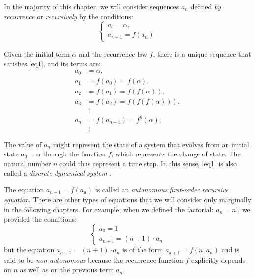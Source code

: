 In the majority of this chapter, we will consider sequences $a_n$ defined
\emph{by recurrence} or \emph{recursively} by the conditions:
\begin{equation}\label{eq1}
\begin{cases}
  a_0 = \alpha,\\
  a_{n+1} = f(a_n)
\end{cases}
\end{equation}

Given the initial term $\alpha$ and the recurrence law $f$, there is a unique
sequence that satisfies \eqref{eq1}, and its terms are:
\begin{align*}
a_0 & =\alpha,\\
a_1 &= f(a_0)=f(\alpha),\\
a_2 &= f(a_1)=f(f(\alpha)),\\
a_3 &= f(a_2)=f(f(f(\alpha))),\\
&\ \vdots\\
a_n &= f(a_{n-1}) = f^n(\alpha),\\
&\ \vdots
\end{align*}

The value of $a_n$ might represent the state of a system that evolves from an
initial state $a_0=\alpha$ through the function $f$, which represents the change
of state. The natural number $n$ could thus represent a time step. In this
sense, \eqref{eq1} is also called a \emph{discrete dynamical system}%
.

The equation $a_{n+1} = f(a_n)$ is called an \emph{autonomous first-order
recursive equation}. There are other types of equations that we will consider
only marginally in the following chapters. For example, when we defined the
factorial: $a_n = n!$, we provided the conditions:
\[
\begin{cases}
  a_0 = 1\\
  a_{n+1} = (n+1) \cdot a_n
\end{cases}
\]
but the equation $a_{n+1} = (n+1) \cdot a_n$ is of the form $a_{n+1} = f(n,
a_n)$ and is said to be \emph{non-autonomous} because the recurrence function
$f$ explicitly depends on $n$ as well as on the previous term $a_n$.

